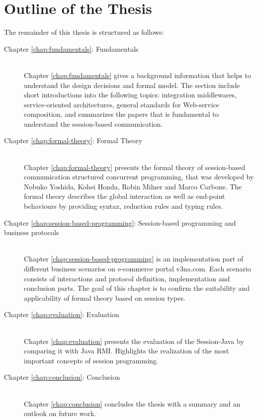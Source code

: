 \section{Outline of the Thesis}

The remainder of this thesis is structured as follows:

\begin{description}
\item[Chapter \ref{chap:fundamentals}: Fundamentals] \hfill \\
Chapter \ref{chap:fundamentals} gives a background information that helps to understand the design decisions and formal model. The section include short introductions into the following topics: integration middlewares, service-oriented architectures, general standards for Web-service composition, and summarizes the papers that is fundamental to understand the session-based communication.

\item[Chapter \ref{chap:formal-theory}: Formal Theory] \hfill \\
Chapter \ref{chap:formal-theory} presents the formal theory of session-based communication structured concurrent programming, that was developed by Nobuko Yoshida, Kohei Honda, Robin Milner and Marco Carbone. The formal theory describes the global interaction as well as end-point behaviours by providing syntax, reduction rules and typing rules.

\item[Chapter \ref{chap:session-based-programming}: Session-based programming and business protocols] \hfill \\
Chapter \ref{chap:session-based-programming} is an implementation part of different business scenarios on e-commerce portal v3na.com. Each scenario consists of interactions and protocol definition, implementation and conclusion parts. The goal of this chapter is to confirm the suitability and applicability of formal theory based on session types.

\item[Chapter \ref{chap:evaluation}: Evaluation] \hfill \\
Chapter \ref{chap:evaluation} presents the evaluation of the Session-Java by comparing it with Java RMI. Highlights the realization of the most important concepts of session programming.

\item[Chapter \ref{chap:conclusion}: Conclusion] \hfill \\
Chapter \ref{chap:conclusion} concludes the thesis with a summary and an outlook on future work.
\end{description}